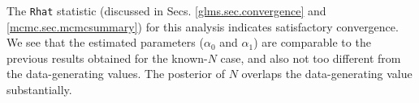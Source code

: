 The \mbox{\tt Rhat} statistic (discussed in Secs. \ref{glms.sec.convergence} and
\ref{mcmc.sec.mcmcsummary}) for this analysis indicates satisfactory
convergence.
We see that the
estimated parameters ($\alpha_0$ and $\alpha_1$) are comparable to the
previous results obtained for the known-$N$ case, and also not too
different from the data-generating values. The posterior of $N$
overlaps the data-generating value substantially.

